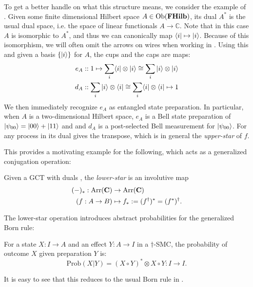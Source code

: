 \begin{example}
\label{ex:bellduals}
To get a better handle on what this structure means, we consider the example of . Given some finite dimensional Hilbert space $A\in\mbox{Ob}(\mathbf{FHilb})$, its dual $A^*$ is the usual dual space, i.e. the space of linear functionals $A\to \mathbb{C}$. Note that in this case $A$ is isomorphic to $A^*$, and thus we can canonically map $\langle i |\mapsto| i \rangle$. Because of this isomorphism, we will often omit the arrows on wires when working in . Using this and given a basis $\{ | i \rangle \}$ for $A$, the cups and the caps are maps:
\begin{align}
e_A &:: 1\mapsto \sum_i\langle i |\otimes| i \rangle\cong\sum_i| i \rangle\otimes| i \rangle
\\
d_A &:: \sum_i| i \rangle\otimes\langle i |\cong\sum_i\langle i |\otimes\langle i | \mapsto 1
\end{align}
We then immediately recognize $e_A$ as entangled state preparation. In particular, when $A$ is a two-dimensional Hilbert space, $e_A$ is a Bell state preparation of $| \psi_{00} \rangle=| 00 \rangle+| 11 \rangle$ and  and $d_A$ is a post-selected Bell measurement for $| \psi_{00} \rangle$. For any process in  its dual gives the transpose, which is in general the \emph{upper-star} of $f$.
\end{example}

This provides a motivating example for the following, which acts as a generalized conjugation operation:

\begin{defn}
Given a GCT with duals , the \emph{lower-star} is an involutive map 
\begin{align*}
(-)_*:\mbox{Arr}(\mathbf{C})&\to\mbox{Arr}(\mathbf{C}) \\
\left(f:A\to B\right) &\mapsto f_*:=(f^\dagger)^*=(f^*)^\dagger.
\end{align*}
\end{defn}

The lower-star operation introduces abstract probabilities for the generalized Born rule:
\begin{defn}
\label{def:bornrule}
For a state $X:I\to A$ and an effect $Y:A\to I$ in a $\dagger$-SMC, the probability of outcome $X$ given preparation $Y$ is:
\begin{equation}
\mbox{Prob}(X|Y) = (X\circ Y)^*\otimes X\circ Y:I\to I.
\end{equation}
\end{defn}
\noindent It is easy to see that this reduces to the usual Born rule in .

